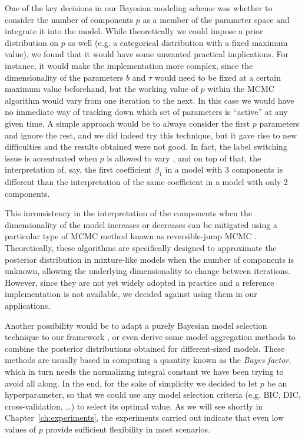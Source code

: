 One of the key decisions in our Bayesian modeling scheme was whether to consider the number of components \(p\) as a member of the parameter space and integrate it into the model. While theoretically we could impose a prior distribution on \(p\) as well (e.g. a categorical distribution with a fixed maximum value), we found that it would have some unwanted practical implications. For instance, it would make the implementation more complex, since the dimensionality of the parameters \(b\) and \(\tau\) would need to be fixed at a certain maximum value beforehand, but the working value of \(p\) within the MCMC algorithm would vary from one iteration to the next. In this case we would have no immediate way of tracking down which set of parameters is ``active'' at any given time. A simple approach would be to always consider the first \(p\) parameters and ignore the rest, and we did indeed try this technique, but it gave rise to new difficulties and the results obtained were not good. In fact, the label switching issue is accentuated when \(p\) is allowed to vary \citep[c.f.][Sec.~2.3]{grollemund2019bayesian}, and on top of that, the interpretation of, say, the first coefficient \(\beta_1\) in a model with \(3\) components is different than the interpretation of the same coefficient in a model with only \(2\) components.

This inconsistency in the interpretation of the components when the dimensionality of the model increases or decreases can be mitigated using a particular type of MCMC method known as reversible-jump MCMC \citep{green1995reversible}. Theoretically, these algorithms are specifically designed to approximate the posterior distribution in mixture-like models when the number of components is unknown, allowing the underlying dimensionality to change between iterations. However, since they are not yet widely adopted in practice and a reference implementation is not available, we decided against using them in our applications.

Another possibility would be to adapt a purely Bayesian model selection technique to our framework \citep[see][]{piironen2017comparison, gelman2013bayesian}, or even derive some model aggregation methods to combine the posterior distributions obtained for different-sized models. These methods are usually based in computing a quantity known as the \textit{Bayes factor}, which in turn needs the normalizing integral constant we have been trying to avoid all along. In the end, for the sake of simplicity we decided to let \(p\) be an hyperparameter, so that we could use any model selection criteria (e.g. BIC, DIC, cross-validation, \ldots) to select its optimal value. As we will see shortly in Chapter~\ref{ch:experiments}, the experiments carried out indicate that even low values of \(p\) provide sufficient flexibility in most scenarios.

